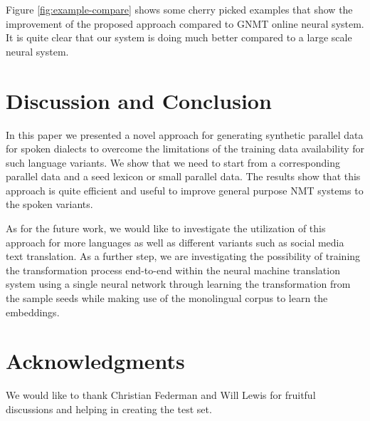 \documentclass[a4paper]{article}
\begin{document}
	
Figure \ref{fig:example-compare} shows some cherry picked examples that show the improvement of the proposed  approach compared to GNMT \cite{WuSCLNMKCGMKSJL16} online neural system. It is quite clear that our system is doing much better compared to a large scale neural system.


\section{Discussion and Conclusion}
\label{sec:conc}
In this paper we presented a novel approach for generating  synthetic parallel  data for spoken dialects to overcome the limitations of the training data availability for such language variants. We show that we need to start from a corresponding parallel data and a seed lexicon or small parallel data. The results show that this approach is quite efficient and useful to improve general purpose NMT systems to the spoken variants. 

As for the future work, we would like to investigate the utilization of this approach for more languages as well as  different variants such as social media text translation. As a further step, we are  investigating the possibility of training the transformation process end-to-end within the neural machine translation system using a single neural network through learning the transformation from the sample seeds while making use of the monolingual corpus to learn the embeddings. 

\section{Acknowledgments}
We would like to thank Christian Federman and Will Lewis for fruitful discussions and helping in creating the test set.

\end{document}
